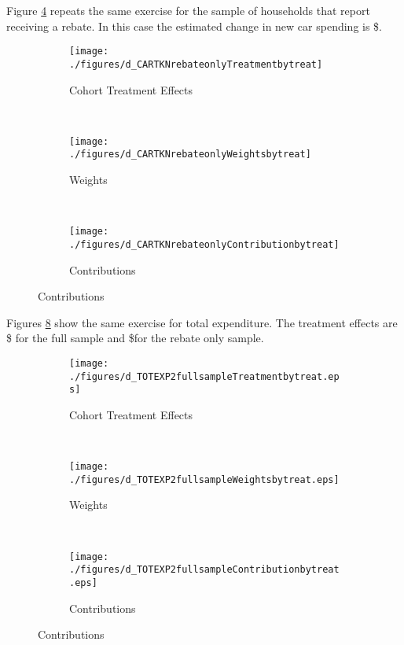 Figure \ref{fig:rebateonlyd_CARTKN} repeats the same exercise for the sample of
households that report receiving a rebate. In this case the estimated
change in new car spending is \$\scalardCARTKNrebateonlytext.

\begin{figure}
    \caption{Change in New Car Spending: Rebate Sample}
    \begin{subfigure}[t]{\linewidth}
        \centering\texttt{[image: ./figures/d\_CARTKNrebateonlyTreatmentbytreat]}
        \caption{Cohort Treatment Effects}
        \label{fig:rebateonlyd_CARTKNTreatmentbytreat}
      \end{subfigure}\\
      \begin{subfigure}[t]{\linewidth}
        \centering\texttt{[image: ./figures/d\_CARTKNrebateonlyWeightsbytreat]}
        \caption{Weights}
        \label{fig:rebateonlyd_CARTKNWeightsbytreat}
      \end{subfigure}\\
      \begin{subfigure}[t]{\linewidth}
        \centering\texttt{[image: ./figures/d\_CARTKNrebateonlyContributionbytreat]}
        \caption{Contributions}
        \label{fig:rebateonlyd_CARTKNContributionbytreat}
      \end{subfigure}
      \label{fig:rebateonlyd_CARTKN}
\end{figure}    

Figures \ref{fig:fullsampled_TOTEXP2} show the same exercise for total
expenditure. The treatment effects are \$\scalardTOTEXPfullsampletext 
for the full sample and \$\scalardTOTEXPrebateonlytext for the rebate only sample.

\begin{figure}
    \caption{Change in Total Spending: Full Sample}
    \begin{subfigure}[t]{\linewidth}
        \centering\texttt{[image: ./figures/d\_TOTEXP2fullsampleTreatmentbytreat.eps]}
        \caption{Cohort Treatment Effects}
        \label{fig:fullsampled_TOTEXP2Treatmentbytreat}
      \end{subfigure}\\
      \begin{subfigure}[t]{\linewidth}
        \centering\texttt{[image: ./figures/d\_TOTEXP2fullsampleWeightsbytreat.eps]}
        \caption{Weights}
        \label{fig:fullsampled_TOTEXP2Weightsbytreat}
      \end{subfigure}\\
      \begin{subfigure}[t]{\linewidth}
        \centering\texttt{[image: ./figures/d\_TOTEXP2fullsampleContributionbytreat.eps]}
        \caption{Contributions}
        \label{fig:fullsampled_TOTEXP2Contributionbytreat}
      \end{subfigure}
      \label{fig:fullsampled_TOTEXP2}
\end{figure}    



